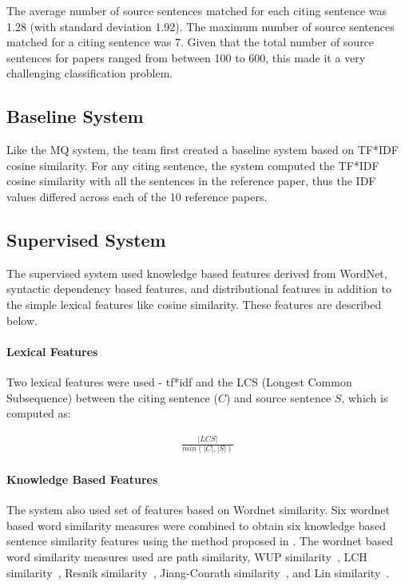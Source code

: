 \documentclass[11pt]{article}
\begin{document}
The average number of source sentences matched for each citing sentence was 
1.28 (with standard deviation 1.92). The maximum number of source sentences 
matched for a citing sentence was 7. Given that the total number of source 
sentences for papers ranged from between 100 to 600, this made it a very 
challenging classification problem. 


\subsection{Baseline System}

Like the MQ system, the team first created a baseline system based on TF*IDF 
cosine similarity. For any citing sentence, the system computed the TF*IDF 
cosine similarity with all the sentences in the reference paper, thus the IDF 
values differed across each of the 10 reference papers. 

\subsection{Supervised System}
The supervised system used knowledge based features derived from WordNet,
syntactic dependency based features, and distributional features in addition 
to the simple lexical features like cosine similarity. These features are 
described below.

\paragraph{Lexical Features} Two lexical features were used - tf*idf and the 
LCS (Longest Common Subsequence) between the citing sentence ($C$) and source 
sentence $S$, which is computed as:

\begin{eqnarray*}
  \frac{|LCS|}{min(|C|,|S|)}
\end{eqnarray*}

\paragraph{Knowledge Based Features} The system also used set of features 
based on Wordnet similarity. Six wordnet based word similarity measures were 
combined to obtain six knowledge based sentence similarity features using the 
method proposed in \cite{Banea2012}. The wordnet based word similarity 
measures used are path similarity, WUP 
similarity~\cite{Wu:1994:VSL:981732.981751}, 
LCH similarity~\cite{leacock1998combining}, 
Resnik similarity~\cite{Resnik:1995:UIC:1625855.1625914}, Jiang-Conrath 
similarity~\cite{Jiang97taxonomySimilarity}, and Lin 
similarity~\cite{Lin:1998:IDS:645527.657297}. 
\end{document}
